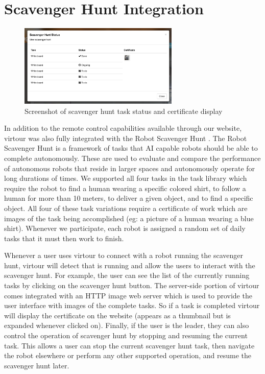 \documentclass[
  oneside,
  11pt, a4paper,
  footinclude=true,
  headinclude=true,
  cleardoublepage=empty
]{article}
\begin{document}
\section{Scavenger Hunt Integration}

\begin{figure}
\centering
\includegraphics[width=3in]{scav_certs}
\caption{Screenshot of scavenger hunt task status and certificate display}
\end{figure}

In addition to the remote control capabilities available through our website,
virtour was also fully integrated with the Robot Scavenger Hunt
\cite{zhang2016}.  The Robot Scavenger Hunt is a framework of tasks that AI
capable robots should be able to complete autonomously. These are used to
evaluate and compare the performance of autonomous robots that reside in larger
spaces and autonomously operate for long durations of times. We supported all
four tasks in the task library which require the robot to find a human wearing
a specific colored shirt, to follow a human for more than 10 meters, to deliver
a given object, and to find a specific object. All four of these task
variations require a certificate of work which are images of the task being
accomplished (eg: a picture of a human wearing a blue shirt). Whenever we
participate, each robot is assigned a random set of daily tasks that it must
then work to finish.

Whenever a user uses virtour to connect with a robot running the scavenger
hunt, virtour will detect that is running and allow the users to interact with
the scavenger hunt. For example, the user can see the list of the currently
running tasks by clicking on the scavenger hunt button. The server-side portion
of virtour comes integrated with an HTTP image web server which is used to
provide the user interface with images of the complete tasks. So if a task is
completed virtour will display the certificate on the website (appears as a
thumbnail but is expanded whenever clicked on).  Finally, if the user is the
leader, they can also control the operation of scavenger hunt by stopping and
resuming the current task. This allows a user can stop the current scavenger
hunt task, then navigate the robot elsewhere or perform any other supported
operation, and resume the scavenger hunt later.
\end{document}
